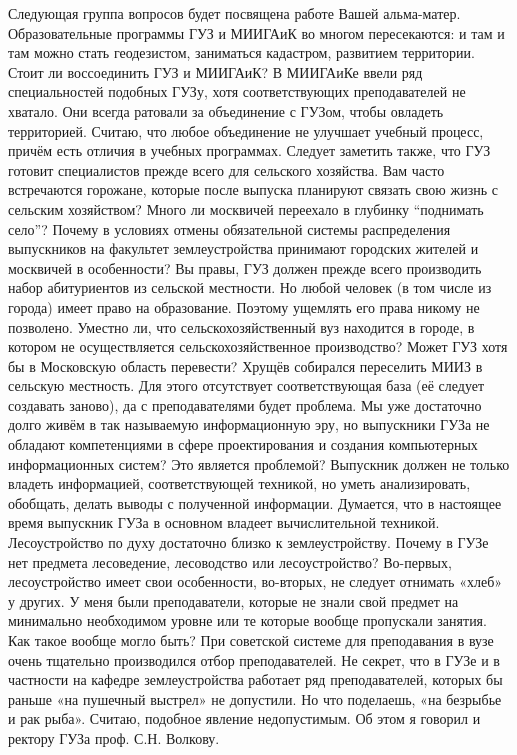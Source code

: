 \begin{drama}
	\maxspeaks Следующая группа вопросов будет посвящена работе Вашей альма-матер. Образовательные программы ГУЗ и МИИГАиК во многом пересекаются: и там и там можно стать геодезистом, заниматься кадастром, развитием территории. Стоит ли воссоединить ГУЗ и МИИГАиК? 
	\michaelspeaks В МИИГАиКе ввели ряд специальностей подобных ГУЗу, хотя соответствующих преподавателей не хватало. Они всегда ратовали за объединение с ГУЗом, чтобы овладеть территорией. Считаю, что любое объединение не улучшает учебный процесс, причём есть отличия в учебных программах. Следует заметить также, что ГУЗ готовит специалистов прежде всего для сельского хозяйства.
	\maxspeaks Вам часто встречаются горожане, которые после выпуска планируют связать свою жизнь с сельским хозяйством? Много ли москвичей переехало в глубинку “поднимать село”? Почему в условиях отмены обязательной системы распределения выпускников на факультет землеустройства принимают городских жителей и москвичей в особенности? 
	\michaelspeaks Вы правы, ГУЗ должен прежде всего производить набор абитуриентов из сельской местности. Но любой человек (в том числе из города) имеет право на образование. Поэтому ущемлять его права никому не позволено. 
	\maxspeaks Уместно ли, что сельскохозяйственный вуз находится в городе, в котором не осуществляется сельскохозяйственное производство? Может ГУЗ хотя бы в Московскую область перевести?
	\michaelspeaks Хрущёв собирался переселить МИИЗ в сельскую местность. Для этого отсутствует соответствующая база (её следует создавать заново), да с преподавателями будет проблема.
	\maxspeaks Мы уже достаточно долго живём в так называемую информационную эру, но выпускники ГУЗа не обладают компетенциями в сфере проектирования и создания компьютерных информационных систем? Это является проблемой?
	\michaelspeaks Выпускник должен не только владеть информацией, соответствующей техникой, но уметь анализировать, обобщать, делать выводы с полученной информации. Думается, что в настоящее время выпускник ГУЗа в основном владеет вычислительной техникой.
	\maxspeaks Лесоустройство по духу достаточно близко к землеустройству. Почему в ГУЗе нет предмета лесоведение, лесоводство или лесоустройство?
	\michaelspeaks Во-первых, лесоустройство имеет свои особенности, во-вторых, не следует отнимать «хлеб» у других.
	\maxspeaks У меня были преподаватели, которые не знали свой предмет на минимально необходимом уровне или те которые вообще пропускали занятия. Как такое вообще могло быть? 
	\michaelspeaks При советской системе для преподавания в вузе очень тщательно производился отбор преподавателей. Не секрет, что в ГУЗе и в частности на кафедре землеустройства работает ряд преподавателей, которых бы раньше «на пушечный выстрел» не допустили. Но что поделаешь, «на безрыбье и рак рыба». Считаю, подобное явление недопустимым. Об этом я говорил и ректору ГУЗа проф. С.Н. Волкову.

\end{drama}
